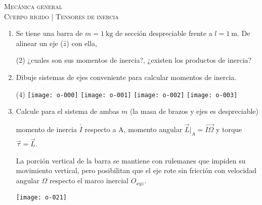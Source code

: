 \documentclass[11pt,spanish,a4paper]{article}
\begin{document}
\begin{center}
  \textsc{\large Mecánica general}\\
  \textsc{\large Cuerpo rígido | Tensores de inercia}
\end{center}


\begin{enumerate}



\item Se tiene una barra de \(m= \SI{1}{\kilo\gram}\) de sección despreciable frente a \(l= \SI{1}{\metre}\).
De alinear un eje (\(\hat{z}\)) con ella, 
\begin{tasks}(2)
	\task	¿cuales son sus momentos de inercia?,
	\task ¿existen los productos de inercia? 
\end{tasks}


\item
Dibuje sistemas de ejes conveniente para calcular momentos de inercia.
\vspace{-1.1cm}
\begin{tasks}(4)
	\task \texttt{[image: o-000]}
	\task \texttt{[image: o-001]}
	\task \texttt{[image: o-002]}
	\task \texttt{[image: o-003]}
\end{tasks}


\item 
\begin{minipage}[t][2.8cm]{0.7\textwidth}
Calcule para el sistema de ambas $m$ (la masa de brazos y ejes es despreciable)
\begin{tasks} 
	\task momento de inercia \(\overline{\overline{I}}\) respecto a A,
	\task momento angular $\vec{L}\bigg\rvert_A = \overline{\overline{I}} \vec{\Omega}$ y torque $\vec{\tau} = \dot{\vec{L}}$.
\end{tasks}
La porción vertical de la barra se mantiene con rulemanes que impiden su movimiento vertical, pero posibilitan que el eje rote sin fricción con velocidad angular $\Omega$ respecto el marco inercial $O_{xyz}$.
\end{minipage}
\begin{minipage}[c][1cm][t]{0.25\textwidth}
	\texttt{[image: o-021]}
\end{minipage}




\end{enumerate}
\end{document}
